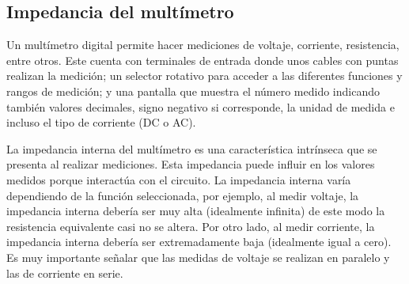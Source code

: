 \documentclass[12pt,a4paper]{article}
\begin{document}
\bigskip
\subsection{Impedancia del multímetro}
Un multímetro digital permite hacer mediciones de voltaje, corriente, resistencia, entre otros. Este cuenta con terminales de entrada donde unos cables con puntas realizan la medición; un selector rotativo para acceder a las diferentes funciones y rangos de medición; y una pantalla que muestra el número medido indicando también valores decimales, signo negativo si corresponde, la unidad de medida e incluso el tipo de corriente (DC o AC).

La impedancia interna del multímetro es una característica intrínseca que se presenta al realizar mediciones. Esta impedancia puede influir en los valores medidos porque interactúa con el circuito. La impedancia interna varía dependiendo de la función seleccionada, por ejemplo, al medir voltaje, la impedancia interna debería ser muy alta (idealmente infinita) de este modo la resistencia equivalente casi no se altera. Por otro lado, al medir corriente, la impedancia interna debería ser extremadamente baja (idealmente igual a cero). Es muy importante señalar que las medidas de voltaje se realizan en paralelo y las de corriente en serie.

\bigskip
{}
\end{document}
